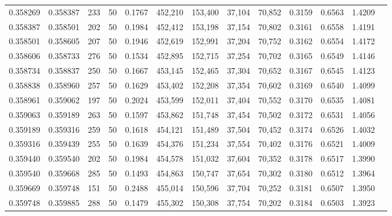\begin{tabular}{rrrrrrrrrrrrr}
0.358269 & 0.358387 &   233 &  50 &                                     0.1767 & 452,210 & 153,400 &  37,104 &  70,852 & 0.3159 & 0.6563 & 1.4209 \\
0.358387 & 0.358501 &   202 &  50 &                                     0.1984 & 452,412 & 153,198 &  37,154 &  70,802 & 0.3161 & 0.6558 & 1.4191 \\
0.358501 & 0.358605 &   207 &  50 &                                     0.1946 & 452,619 & 152,991 &  37,204 &  70,752 & 0.3162 & 0.6554 & 1.4172 \\
0.358606 & 0.358733 &   276 &  50 &                                     0.1534 & 452,895 & 152,715 &  37,254 &  70,702 & 0.3165 & 0.6549 & 1.4146 \\
0.358734 & 0.358837 &   250 &  50 &                                     0.1667 & 453,145 & 152,465 &  37,304 &  70,652 & 0.3167 & 0.6545 & 1.4123 \\
0.358838 & 0.358960 &   257 &  50 &                                     0.1629 & 453,402 & 152,208 &  37,354 &  70,602 & 0.3169 & 0.6540 & 1.4099 \\
0.358961 & 0.359062 &   197 &  50 &                                     0.2024 & 453,599 & 152,011 &  37,404 &  70,552 & 0.3170 & 0.6535 & 1.4081 \\
0.359063 & 0.359189 &   263 &  50 &                                     0.1597 & 453,862 & 151,748 &  37,454 &  70,502 & 0.3172 & 0.6531 & 1.4056 \\
0.359189 & 0.359316 &   259 &  50 &                                     0.1618 & 454,121 & 151,489 &  37,504 &  70,452 & 0.3174 & 0.6526 & 1.4032 \\
0.359316 & 0.359439 &   255 &  50 &                                     0.1639 & 454,376 & 151,234 &  37,554 &  70,402 & 0.3176 & 0.6521 & 1.4009 \\
0.359440 & 0.359540 &   202 &  50 &                                     0.1984 & 454,578 & 151,032 &  37,604 &  70,352 & 0.3178 & 0.6517 & 1.3990 \\
0.359540 & 0.359668 &   285 &  50 &                                     0.1493 & 454,863 & 150,747 &  37,654 &  70,302 & 0.3180 & 0.6512 & 1.3964 \\
0.359669 & 0.359748 &   151 &  50 &                                     0.2488 & 455,014 & 150,596 &  37,704 &  70,252 & 0.3181 & 0.6507 & 1.3950 \\
0.359748 & 0.359885 &   288 &  50 &                                     0.1479 & 455,302 & 150,308 &  37,754 &  70,202 & 0.3184 & 0.6503 & 1.3923 \\

\end{tabular}
